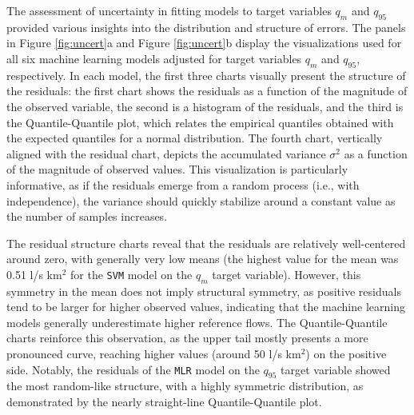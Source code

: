 \documentclass[12pt]{article}
\begin{document}
\par The assessment of uncertainty in fitting models to target variables $q_{m}$ and $q_{95}$ provided various insights into the distribution and structure of errors. The panels in Figure \ref{fig:uncert}a and Figure \ref{fig:uncert}b display the visualizations used for all six machine learning models adjusted for target variables $q_{m}$ and $q_{95}$, respectively. In each model, the first three charts visually present the structure of the residuals: the first chart shows the residuals as a function of the magnitude of the observed variable, the second is a histogram of the residuals, and the third is the Quantile-Quantile plot, which relates the empirical quantiles obtained with the expected quantiles for a normal distribution. The fourth chart, vertically aligned with the residual chart, depicts the accumulated variance $\sigma^2$ as a function of the magnitude of observed values. This visualization is particularly informative, as if the residuals emerge from a random process (i.e., with independence), the variance should quickly stabilize around a constant value as the number of samples increases.

\par The residual structure charts reveal that the residuals are relatively well-centered around zero, with generally very low means (the highest value for the mean was 0.51 l/s km$^2$ for the \texttt{SVM} model on the $q_m$ target variable). However, this symmetry in the mean does not imply structural symmetry, as positive residuals tend to be larger for higher observed values, indicating that the machine learning models generally underestimate higher reference flows. The Quantile-Quantile charts reinforce this observation, as the upper tail mostly presents a more pronounced curve, reaching higher values (around 50 l/s km$^2$) on the positive side. Notably, the residuals of the \texttt{MLR} model on the $q_{95}$ target variable showed the most random-like structure, with a highly symmetric distribution, as demonstrated by the nearly straight-line Quantile-Quantile plot.
\end{document}
